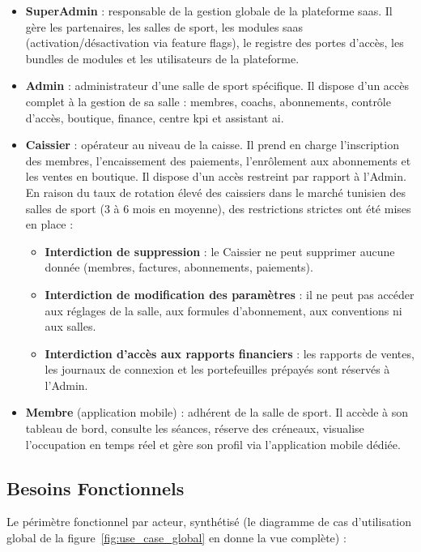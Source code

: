 \documentclass[../main.tex]{subfiles}
\begin{document}
\begin{itemize}
  \item \textbf{SuperAdmin} : responsable de la gestion globale de la plateforme \acrshort{saas}. Il g\`{e}re les partenaires, les salles de sport, les modules \acrshort{saas} (activation/d\'{e}sactivation via feature flags), le registre des portes d'acc\`{e}s, les bundles de modules et les utilisateurs de la plateforme.

  \item \textbf{Admin} : administrateur d'une salle de sport sp\'{e}cifique. Il dispose d'un acc\`{e}s complet \`{a} la gestion de sa salle : membres, coachs, abonnements, contr\^{o}le d'acc\`{e}s, boutique, finance, centre \acrshort{kpi} et assistant \acrshort{ai}.

  \item \textbf{Caissier} : op\'{e}rateur au niveau de la caisse. Il prend en charge l'inscription des membres, l'encaissement des paiements, l'enr\^{o}lement aux abonnements et les ventes en boutique. Il dispose d'un acc\`{e}s restreint par rapport \`{a} l'Admin. En raison du taux de rotation \'{e}lev\'{e} des caissiers dans le march\'{e} tunisien des salles de sport (3 \`{a} 6 mois en moyenne), des restrictions strictes ont \'{e}t\'{e} mises en place :
  \begin{itemize}
    \item \textbf{Interdiction de suppression} : le Caissier ne peut supprimer aucune donn\'{e}e (membres, factures, abonnements, paiements).
    \item \textbf{Interdiction de modification des param\`{e}tres} : il ne peut pas acc\'{e}der aux r\'{e}glages de la salle, aux formules d'abonnement, aux conventions ni aux salles.
    \item \textbf{Interdiction d'acc\`{e}s aux rapports financiers} : les rapports de ventes, les journaux de connexion et les portefeuilles pr\'{e}pay\'{e}s sont r\'{e}serv\'{e}s \`{a} l'Admin.
  \end{itemize}

  \item \textbf{Membre} (application mobile) : adh\'{e}rent de la salle de sport. Il acc\`{e}de \`{a} son tableau de bord, consulte les s\'{e}ances, r\'{e}serve des cr\'{e}neaux, visualise l'occupation en temps r\'{e}el et g\`{e}re son profil via l'application mobile d\'{e}di\'{e}e.
\end{itemize}

\subsection{Besoins Fonctionnels}
Le p\'{e}rim\`{e}tre fonctionnel par acteur, synth\'{e}tis\'{e} (le diagramme de cas d'utilisation global de la figure~\ref{fig:use_case_global} en donne la vue compl\`{e}te) :
\end{document}
